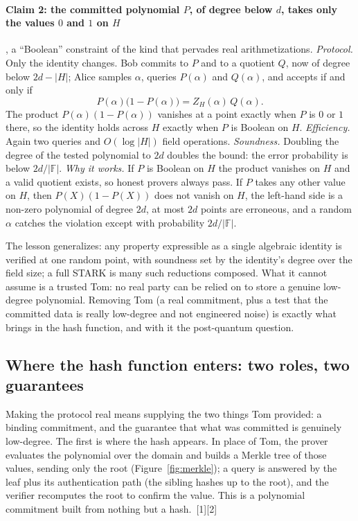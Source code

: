 \documentclass[11pt]{article}
\begin{document}
\paragraph{Claim 2: the committed polynomial $P$, of degree below $d$, takes only the values $0$ and
$1$ on $H$}, a ``Boolean'' constraint of the kind that pervades real arithmetizations.
\emph{Protocol.} Only the identity changes. Bob commits to $P$ and to a quotient $Q$, now of degree
below $2d-|H|$; Alice samples $\alpha$, queries $P(\alpha)$ and $Q(\alpha)$, and accepts if and only if
\begin{equation}
  P(\alpha)\bigl(1-P(\alpha)\bigr) = Z_H(\alpha)\,Q(\alpha).
\end{equation}
The product $P(\alpha)(1-P(\alpha))$ vanishes at a point exactly when $P$ is $0$ or $1$ there, so the
identity holds across $H$ exactly when $P$ is Boolean on $H$. \emph{Efficiency.} Again two queries and
$O(\log|H|)$ field operations. \emph{Soundness.} Doubling the degree of the tested polynomial to $2d$
doubles the bound: the error probability is below $2d/|\mathbb{F}|$. \emph{Why it works.} If $P$ is
Boolean on $H$ the product vanishes on $H$ and a valid quotient exists, so honest provers always pass.
If $P$ takes any other value on $H$, then $P(X)(1-P(X))$ does not vanish on $H$, the left-hand side is a
non-zero polynomial of degree $2d$, at most $2d$ points are erroneous, and a random $\alpha$ catches
the violation except with probability $2d/|\mathbb{F}|$.

The lesson generalizes: any property expressible as a single algebraic identity is verified at one
random point, with soundness set by the identity's degree over the field size; a full STARK is many such
reductions composed. What it cannot assume is a trusted Tom: no real party can be relied on to store a
genuine low-degree polynomial. Removing Tom (a real commitment, plus a test that the committed data is
really low-degree and not engineered noise) is exactly what brings in the hash function, and with it the
post-quantum question.

\subsection{Where the hash function enters: two roles, two guarantees}

Making the protocol real means supplying the two things Tom provided: a binding commitment, and the
guarantee that what was committed is genuinely low-degree. The first is where the hash appears. In place
of Tom, the prover evaluates the polynomial over the domain and builds a Merkle tree of those values,
sending only the root (Figure~\ref{fig:merkle}); a query is answered by the leaf plus its authentication
path (the sibling hashes up to the root), and the verifier recomputes the root to confirm the value.
This is a polynomial commitment built from nothing but a hash.~[1][2]
\end{document}
